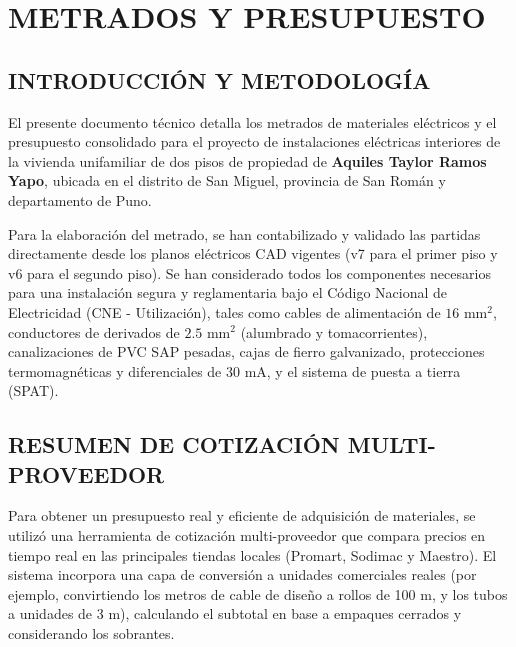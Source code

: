 \documentclass[12pt,letterpaper]{report}
\begin{document}
\hypersetup{pageanchor=false}

\clearpage
\hypersetup{pageanchor=true}

\pagestyle{memoria}

\renewcommand{\documentfootertext}{METRADOS Y PRESUPUESTO - INSTALACIONES ELECTRICAS}

\chapter*{METRADOS Y PRESUPUESTO}

\setcounter{section}{0}
\renewcommand{\thesection}{6.\arabic{section}.}
\renewcommand{\thesubsection}{6.\arabic{section}.\arabic{subsection}.}
\renewcommand{\theHsection}{metrado.\arabic{section}}
\renewcommand{\theHsubsection}{metrado.\arabic{section}.\arabic{subsection}}

\section{INTRODUCCIÓN Y METODOLOGÍA}
El presente documento técnico detalla los metrados de materiales eléctricos y el presupuesto consolidado para el proyecto de instalaciones eléctricas interiores de la vivienda unifamiliar de dos pisos de propiedad de \textbf{Aquiles Taylor Ramos Yapo}, ubicada en el distrito de San Miguel, provincia de San Román y departamento de Puno.

Para la elaboración del metrado, se han contabilizado y validado las partidas directamente desde los planos eléctricos CAD vigentes (v7 para el primer piso y v6 para el segundo piso). Se han considerado todos los componentes necesarios para una instalación segura y reglamentaria bajo el Código Nacional de Electricidad (CNE - Utilización), tales como cables de alimentación de $16\text{ mm}^2$, conductores de derivados de $2.5\text{ mm}^2$ (alumbrado y tomacorrientes), canalizaciones de PVC SAP pesadas, cajas de fierro galvanizado, protecciones termomagnéticas y diferenciales de $30\text{ mA}$, y el sistema de puesta a tierra (SPAT).

\section{RESUMEN DE COTIZACIÓN MULTI-PROVEEDOR}
Para obtener un presupuesto real y eficiente de adquisición de materiales, se utilizó una herramienta de cotización multi-proveedor que compara precios en tiempo real en las principales tiendas locales (Promart, Sodimac y Maestro). El sistema incorpora una capa de conversión a unidades comerciales reales (por ejemplo, convirtiendo los metros de cable de diseño a rollos de 100 m, y los tubos a unidades de 3 m), calculando el subtotal en base a empaques cerrados y considerando los sobrantes.
\end{document}
